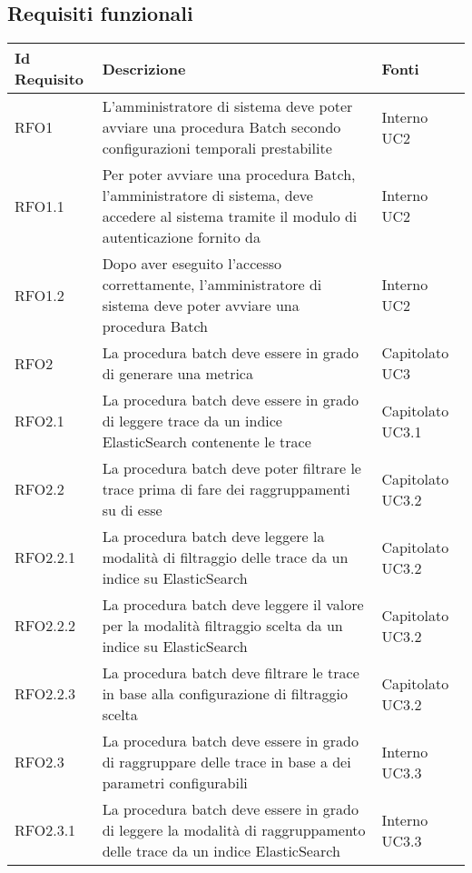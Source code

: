 \subsection{Requisiti funzionali} \label{requisiti fun}
\begin{center}
    \begin{longtable}{ | >{\centering\arraybackslash}m{2.5cm} | >{\centering\arraybackslash}m{8cm} | >{\centering\arraybackslash}m{2.5cm} | }
        
        \hline
        \textbf{Id Requisito} & \textbf{Descrizione} & \textbf{Fonti} \\ \hline
        \endhead
        RFO1 & L'amministratore di sistema deve poter avviare una procedura Batch secondo configurazioni temporali prestabilite & Interno UC2 \\ \hline
        RFO1.1 & Per poter avviare una procedura Batch, l'amministratore di sistema, deve accedere al sistema tramite il modulo di 						autenticazione fornito da \Proponente{} & Interno UC2 \\ \hline
        RFO1.2 & Dopo aver eseguito l'accesso correttamente, l'amministratore di sistema deve poter avviare una procedura Batch & Interno UC2 \\ \hline
        RFO2 & La procedura batch deve essere in grado di generare una metrica & Capitolato UC3\\ \hline
        RFO2.1 & La procedura batch deve essere in grado di leggere trace da un indice ElasticSearch contenente le trace & Capitolato UC3.1\\ \hline
        RFO2.2 & La procedura batch deve poter filtrare le trace prima di fare dei raggruppamenti su di esse & Capitolato UC3.2\\ \hline
        RFO2.2.1 & La procedura batch deve leggere la modalità di filtraggio delle trace da un indice su ElasticSearch & Capitolato UC3.2\\ \hline
        RFO2.2.2 & La procedura batch deve leggere il valore per la modalità filtraggio scelta da un indice su ElasticSearch & Capitolato UC3.2\\ \hline
        RFO2.2.3 & La procedura batch deve filtrare le trace in base alla configurazione di filtraggio scelta & Capitolato UC3.2\\ \hline
        RFO2.3 & La procedura batch deve essere in grado di raggruppare delle trace in base a dei parametri configurabili & Interno UC3.3\\ \hline
        RFO2.3.1 & La procedura batch deve essere in grado di leggere la modalità di raggruppamento delle trace da un indice ElasticSearch & Interno UC3.3 \\ \hline

\end{longtable}
\end{center}
